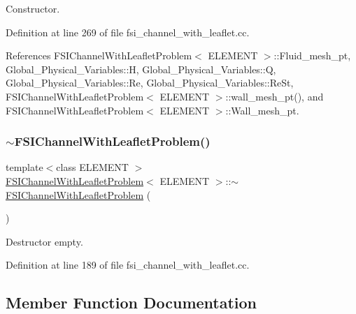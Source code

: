 Constructor. 

Definition at line 269 of file fsi\+\_\+channel\+\_\+with\+\_\+leaflet.\+cc.



References F\+S\+I\+Channel\+With\+Leaflet\+Problem$<$ E\+L\+E\+M\+E\+N\+T $>$\+::\+Fluid\+\_\+mesh\+\_\+pt, Global\+\_\+\+Physical\+\_\+\+Variables\+::H, Global\+\_\+\+Physical\+\_\+\+Variables\+::Q, Global\+\_\+\+Physical\+\_\+\+Variables\+::\+Re, Global\+\_\+\+Physical\+\_\+\+Variables\+::\+Re\+St, F\+S\+I\+Channel\+With\+Leaflet\+Problem$<$ E\+L\+E\+M\+E\+N\+T $>$\+::wall\+\_\+mesh\+\_\+pt(), and F\+S\+I\+Channel\+With\+Leaflet\+Problem$<$ E\+L\+E\+M\+E\+N\+T $>$\+::\+Wall\+\_\+mesh\+\_\+pt.

\mbox{\label{classFSIChannelWithLeafletProblem_a5df1d8f7229314a92ffb48ec61f56fe0}} 
\subsubsection{\texorpdfstring{$\sim$\+F\+S\+I\+Channel\+With\+Leaflet\+Problem()}{~FSIChannelWithLeafletProblem()}}
{\footnotesize\ttfamily template$<$class E\+L\+E\+M\+E\+NT $>$ \\
\hyperlink{classFSIChannelWithLeafletProblem}{F\+S\+I\+Channel\+With\+Leaflet\+Problem}$<$ E\+L\+E\+M\+E\+NT $>$\+::$\sim$\hyperlink{classFSIChannelWithLeafletProblem}{F\+S\+I\+Channel\+With\+Leaflet\+Problem} (\begin{DoxyParamCaption}{ }\end{DoxyParamCaption})\hspace{0.3cm}{\ttfamily [inline]}}



Destructor empty. 



Definition at line 189 of file fsi\+\_\+channel\+\_\+with\+\_\+leaflet.\+cc.



\subsection{Member Function Documentation}
\mbox{\label{classFSIChannelWithLeafletProblem_acc3f4745ea9b4524aebbc4f2556d1286}} 
